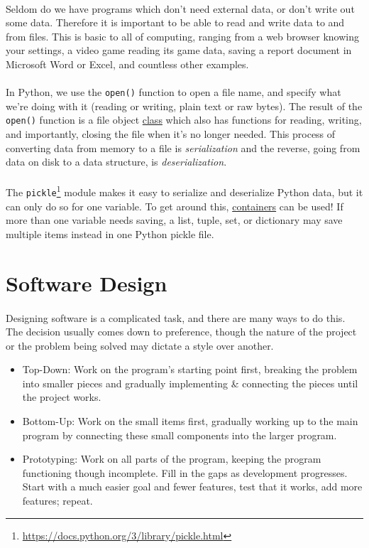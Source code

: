 \documentclass[letter,10pt]{article}
\begin{document}
\paragraph{}Seldom do we have programs which don't need external data, or don't write out some data. Therefore it is important to be able to read and write data to and from files. This is basic to all of computing, ranging from a web browser knowing your settings, a video game reading its game data, saving a report document in Microsoft Word or Excel, and countless other examples.

\paragraph{}In Python, we use the \verb|open()| function to open a file name, and specify what we're doing with it (reading or writing, plain text or raw bytes). The result of the \verb|open()| function is a file object \hyperref[sec:classes]{class} which also has functions for reading, writing, and importantly, closing the file when it's no longer needed. This process of converting data from memory to a file is \textit{serialization} and the reverse, going from data on disk to a data structure, is \textit{deserialization}.

\paragraph{}The \verb|pickle|\footnote{\url{https://docs.python.org/3/library/pickle.html}} module makes it easy to serialize and deserialize Python data, but it can only do so for one variable. To get around this, \hyperref[sec:containers]{containers} can be used! If more than one variable needs saving, a list, tuple, set, or dictionary may save multiple items instead in one Python pickle file.

\section{Software Design}
\paragraph{}Designing software is a complicated task, and there are many ways to do this. The decision usually comes down to preference, though the nature of the project or the problem being solved may dictate a style over another.

\begin{itemize}
    \item Top-Down: Work on the program's starting point first, breaking the problem into smaller pieces and gradually implementing \& connecting the pieces until the project works.
    \item Bottom-Up: Work on the small items first, gradually working up to the main program by connecting these small components into the larger program.
    \item Prototyping: Work on all parts of the program, keeping the program functioning though incomplete. Fill in the gaps as development progresses. Start with a much easier goal and fewer features, test that it works, add more features; repeat.
\end{itemize}
\end{document}
